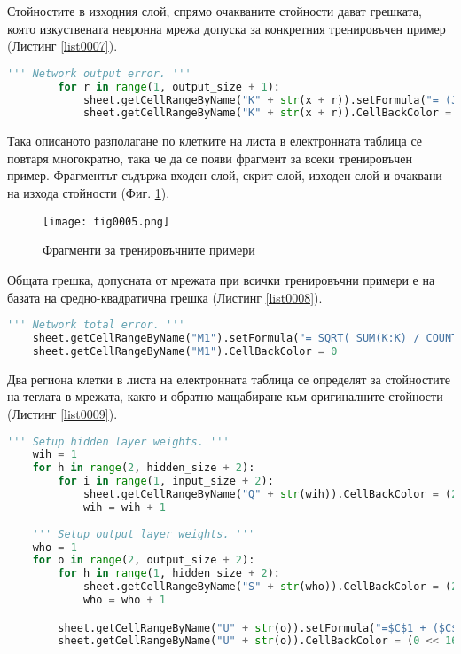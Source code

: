 Стойностите в изходния слой, спрямо очакваните стойности дават грешката, която изкуствената невронна мрежа допуска за конкретния тренировъчен пример (Листинг \ref{list0007}).

\begin{lstlisting}[caption=Стойност на грешката допусната от мрежата за конкретния пример, language=Python, basicstyle=\tiny, label=list0007]
        ''' Network output error. '''
        for r in range(1, output_size + 1):
            sheet.getCellRangeByName("K" + str(x + r)).setFormula("= (J" + str(x + r) + "-I" + str(x + r) + ") * (J" + str(x + r) + "-I" + str(x + r) + ")")
            sheet.getCellRangeByName("K" + str(x + r)).CellBackColor = (0 << 16 | 255 << 8 | 255)
\end{lstlisting}

Така описаното разполагане по клетките на листа в електронната таблица се повтаря многократно, така че да се появи фрагмент за всеки тренировъчен пример. Фрагментът съдържа входен слой, скрит слой, изходен слой и очаквани на изхода стойности (Фиг. \ref{fig0005}).

\begin{figure}[H]
  \centering
  \texttt{[image: fig0005.png]}
  \caption{Фрагменти за тренировъчните примери}
\label{fig0005}
\end{figure}

Общата грешка, допусната от мрежата при всички тренировъчни примери е на базата на средно-квадратична грешка (Листинг \ref{list0008}).

\begin{lstlisting}[caption=Обща средно-квадратична грешка на мрежата, language=Python, basicstyle=\tiny, label=list0008]
    ''' Network total error. '''
    sheet.getCellRangeByName("M1").setFormula("= SQRT( SUM(K:K) / COUNT(K:K) )")
    sheet.getCellRangeByName("M1").CellBackColor = 0
\end{lstlisting}

Два региона клетки в листа на електронната таблица се определят за стойностите на теглата в мрежата, както и обратно мащабиране към оригиналните стойности (Листинг \ref{list0009}).

\begin{lstlisting}[caption=Определяне на региони за теглата на мрежата, language=Python, basicstyle=\tiny, label=list0009]
    ''' Setup hidden layer weights. '''
    wih = 1
    for h in range(2, hidden_size + 2):
        for i in range(1, input_size + 2):
            sheet.getCellRangeByName("Q" + str(wih)).CellBackColor = (255 << 16 | 0 << 8 | 255)
            wih = wih + 1
        
    ''' Setup output layer weights. '''
    who = 1
    for o in range(2, output_size + 2):
        for h in range(1, hidden_size + 2):
            sheet.getCellRangeByName("S" + str(who)).CellBackColor = (255 << 16 | 0 << 8 | 255)
            who = who + 1

        sheet.getCellRangeByName("U" + str(o)).setFormula("=$C$1 + ($C$2 - $C$1) * ((T" + str(o) + " - $C$4) / ($C$5 - $C$4))")
        sheet.getCellRangeByName("U" + str(o)).CellBackColor = (0 << 16 | 127 << 8 | 0)
\end{lstlisting}

